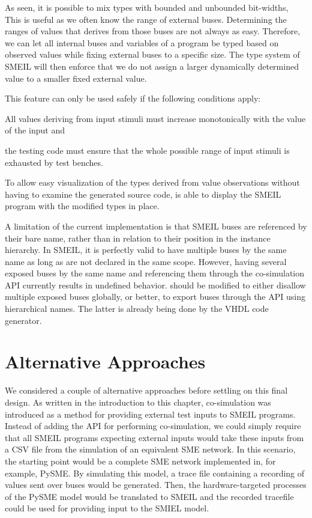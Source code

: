 As seen, it is possible to mix types with bounded and unbounded bit-widths, This
is useful as we often know the range of external buses. Determining the
ranges of values that derives from those buses are not always as
easy. Therefore, we can let all internal buses and variables of a program be
typed based on observed values while fixing external buses to a specific
size. The type system of SMEIL will then enforce that we do not assign a larger
dynamically determined value to a smaller fixed external value.

This feature can only be used safely if the following conditions
apply: \begin{inparaenum}[1)] \item All values deriving from input stimuli must
  increase monotonically with the value of the input and \item the testing code
  must ensure that the whole possible range of input stimuli is exhausted by
  test benches.
\end{inparaenum}

To allow easy visualization of the types derived from value observations without
having to examine the generated source code, \libsme{} is able to display the
SMEIL program with the modified types in place.

A limitation of the current implementation is that SMEIL buses are referenced by
their bare name, rather than in relation to their position in the instance
hierarchy. In SMEIL, it is perfectly valid to have multiple buses by the same
name as long as are not declared in the same scope. However, having several
{\ttfamily exposed} buses by the same name and referencing them through the
co-simulation API currently results in undefined behavior. \libsme{} should be
modified to either disallow multiple {\ttfamily exposed} buses globally, or
better, to export buses through the API using hierarchical names. The latter is
already being done by the VHDL code generator.

\section{Alternative Approaches}
We considered a couple of alternative approaches before settling on this final
design. As written in the introduction to this chapter, co-simulation was
introduced as a method for providing external test inputs to SMEIL programs.
Instead of adding the API for performing co-simulation, we could simply require
that all SMEIL programs expecting external inputs would take these inputs from a
CSV file from the simulation of an equivalent SME network. In this scenario, the
starting point would be a complete SME network implemented in, for example,
PySME. By simulating this model, a trace file containing a recording of values
sent over buses would be generated. Then, the hardware-targeted processes of the
PySME model would be translated to SMEIL and the recorded tracefile could be
used for providing input to the SMIEL model.

